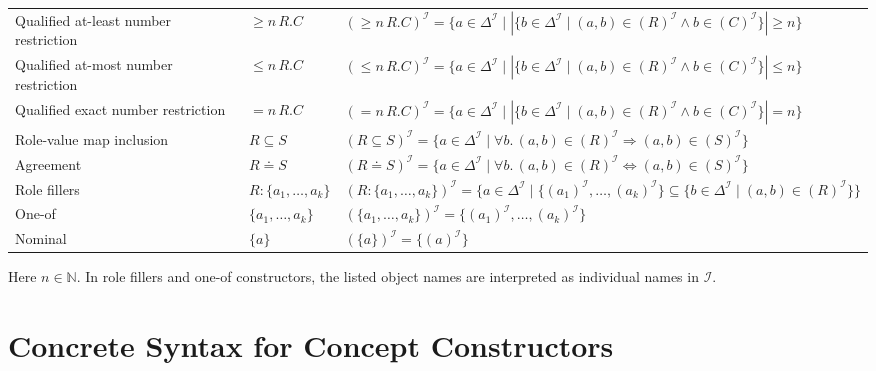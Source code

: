 \documentclass[11pt]{article}
\newcommand{\I}{\mathcal{I}}
\newcommand{\DeltaI}{\Delta^{\I}}
\newcommand{\sem}[1]{\left(#1\right)^{\I}}
\newcommand{\Nat}{\mathbb{N}}
\newenvironment{compacttable}
  {\begingroup\setlength{\tabcolsep}{3pt}}
  {\endgroup}
\begin{document}
\begin{compacttable}
\begin{longtable}{>{\raggedright\arraybackslash}p{}
                  >{\centering\arraybackslash}p{}
                  >{\raggedright\arraybackslash}p{}}
Qualified at-least number restriction &
$\geq n\,R.C$ &
$\sem{\geq n\,R.C} = \{ a \in \DeltaI \mid |\{ b \in \DeltaI \mid (a,b)\in\sem{R} \land b\in\sem{C} \}| \geq n \}$ \\

Qualified at-most number restriction &
$\leq n\,R.C$ &
$\sem{\leq n\,R.C} = \{ a \in \DeltaI \mid |\{ b \in \DeltaI \mid (a,b)\in\sem{R} \land b\in\sem{C} \}| \leq n \}$ \\

Qualified exact number restriction &
$= n\,R.C$ &
$\sem{= n\,R.C} = \{ a \in \DeltaI \mid |\{ b \in \DeltaI \mid (a,b)\in\sem{R} \land b\in\sem{C} \}| = n \}$ \\

Role-value map inclusion &
$R \subseteq S$ &
$\sem{R \subseteq S} = \{ a \in \DeltaI \mid \forall b.\,(a,b)\in\sem{R} \Rightarrow (a,b)\in\sem{S} \}$ \\

Agreement &
$R \doteq S$ &
$\sem{R \doteq S} = \{ a \in \DeltaI \mid \forall b.\,(a,b)\in\sem{R} \Leftrightarrow (a,b)\in\sem{S} \}$ \\

Role fillers &
$R:\{a_1,\ldots,a_k\}$ &
$\sem{R:\{a_1,\ldots,a_k\}} = \{ a \in \DeltaI \mid \{\sem{a_1},\ldots,\sem{a_k}\} \subseteq \{ b \in \DeltaI \mid (a,b)\in\sem{R} \} \}$ \\

One-of &
$\{a_1,\ldots,a_k\}$ &
$\sem{\{a_1,\ldots,a_k\}} = \{\sem{a_1},\ldots,\sem{a_k}\}$ \\

Nominal &
$\{a\}$ &
$\sem{\{a\}} = \{\sem{a}\}$ \\

\bottomrule
\end{longtable}
\end{compacttable}

Here $n \in \Nat$. In role fillers and one-of constructors, the listed
object names are interpreted as individual names in $\I$.

\section{Concrete Syntax for Concept Constructors}
\end{document}
